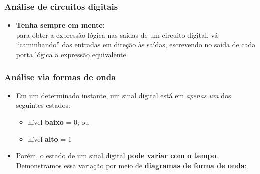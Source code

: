 \documentclass{beamer}
\begin{document}

\begin{frame}
\frametitle{Análise de circuitos digitais}

\begin{itemize}
\item \textbf{Tenha sempre em mente:}\\ para obter a expressão lógica nas saídas
de um circuito digital, vá ``caminhando'' das entradas em direção às
saídas, escrevendo no saída de cada porta lógica a expressão equivalente.
\end{itemize}

\end{frame}


\begin{frame}
\frametitle{Análise via formas de onda}

\begin{itemize}
\item Em um determinado instante, um sinal digital está em \emph{apenas um}
dos seguintes estados:
\begin{itemize}
\item nível \textbf{baixo} = 0; ou
\item nível \textbf{alto} = 1
\end{itemize}
\pause
\item Porém, o estado de um sinal digital \textbf{pode variar com o tempo}.
Demonstramos essa variação por meio de \textbf{diagramas de forma de onda}:
\end{itemize}
\begin{center}
%
%
\end{center}

\end{frame}
\end{document}
